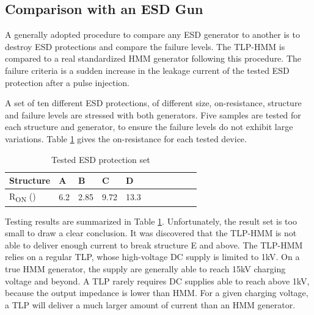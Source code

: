 

\subsection{Comparison with an ESD Gun}

A generally adopted procedure to compare any ESD generator to another is to destroy ESD protections and compare the failure levels.
The TLP-HMM is compared to a real standardized HMM generator following this procedure.
The failure criteria is a sudden increase in the leakage current of the tested ESD protection after a pulse injection.

A set of ten different ESD protections, of different size, on-resistance, structure and failure levels are stressed with both generators.
Five samples are tested for each structure and generator, to ensure the failure levels do not exhibit large variations.
Table \ref{tab:esd-protections} gives the on-resistance for each tested device.

\begin{table}[!h]
\centering
\begin{tabular}{@{}lllllllllll@{}}
\toprule
Structure                          & A    & B    & C     & D    \\ \midrule
R\textsubscript{ON} (\textOmega{}) & 6.2  & 2.85 & 9.72  & 13.3 \\
\end{tabular}
\caption{Tested ESD protection set}
\label{tab:esd-protections}
\end{table}

Testing results are summarized in Table \ref{tab:esd-protections}.
Unfortunately, the result set is too small to draw a clear conclusion.
It was discovered that the TLP-HMM is not able to deliver enough current to break structure E and above.
The TLP-HMM relies on a regular TLP, whose high-voltage DC supply is limited to 1kV.
On a true HMM generator, the supply are generally able to reach 15kV charging voltage and beyond.
A TLP rarely requires DC supplies able to reach above 1kV, because the output impedance is lower than HMM.
For a given charging voltage, a TLP will deliver a much larger amount of current than an HMM generator.


